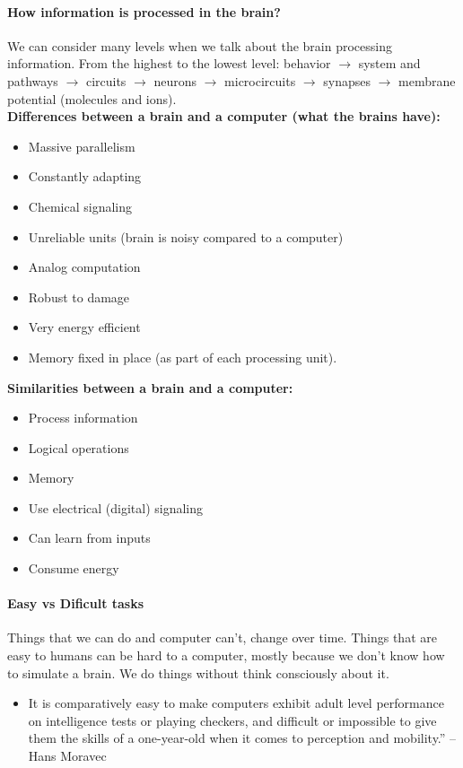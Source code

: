 \documentclass[a4paper, 12pt]{article}
\begin{document}
\paragraph{How information is processed in the brain?}
We can consider many levels when we talk about the brain processing information. From the highest to the lowest level: behavior $\rightarrow$ system and pathways $\rightarrow$ circuits $\rightarrow$ neurons $\rightarrow$ microcircuits $\rightarrow$ synapses $\rightarrow$ membrane potential (molecules and ions). \\

\textbf{Differences between a brain and a computer (what the brains have):}
\begin{itemize}[noitemsep,nolistsep]
	\item Massive parallelism
	\item Constantly adapting
	\item Chemical signaling
	\item Unreliable units (brain is noisy compared to a computer)
	\item Analog computation
	\item Robust to damage
	\item Very energy efficient
	\item Memory fixed in place (as part of each processing unit).
\end{itemize}
\textbf{Similarities between a brain and a computer:}
\begin{itemize}[noitemsep,nolistsep]
	\item Process information
	\item Logical operations
	\item Memory
	\item Use electrical (digital) signaling
	\item Can learn from inputs
	\item Consume energy
\end{itemize}

\paragraph{Easy vs Dificult tasks}
Things that we can do and computer can't, change over time. Things that are easy to humans can be hard to a computer, mostly because we don't know how to simulate a brain. We do things without think consciously about it.

\begin{itemize}
\item It is comparatively easy to make computers exhibit adult level performance on intelligence tests or playing checkers, and difficult or impossible to give them the skills of a one-year-old when it comes to perception and mobility.” – Hans Moravec
\end{itemize}
\end{document}

